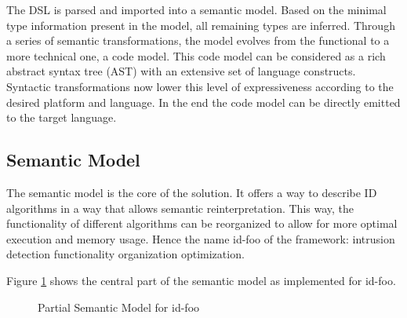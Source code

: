 \documentclass[conference]{IEEEtran}
\newcommand{\NAME}{id-foo\xspace}
\begin{document}
The DSL is parsed and imported into a semantic model. Based on the minimal type
information present in the model, all remaining types are inferred. Through a
series of semantic transformations, the model evolves from the functional to a
more technical one, a code model. This code model can be considered as a rich
abstract syntax tree (AST) with an extensive set of language constructs.
Syntactic transformations now lower this level of expressiveness according to
the desired platform and language. In the end the code model can be directly
emitted to the target language.

\subsection{Semantic Model}

The semantic model is the core of the solution. It offers a way to describe ID
algorithms in a way that allows semantic reinterpretation. This way, the
functionality of different algorithms can be reorganized to allow for more
optimal execution and memory usage. Hence the name \NAME of the framework:
intrusion detection functionality organization optimization.

Figure \ref{fig:meta-model} shows the central part of the semantic model as
implemented for \NAME.


\begin{figure}[ht]
  \centering
\caption{Partial Semantic Model for \NAME}
\label{fig:meta-model}
\end{figure}
\end{document}
